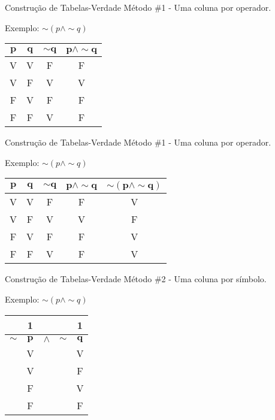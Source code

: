 \begin{frame}[t]{Construção de Tabelas-Verdade} %
	Método \#1 - Uma coluna por operador.
	
	\begin{center}
	Exemplo: $\sim (p \wedge \sim q)$
	
	\vskip 0.8cm
		
	\begin{tabular}{|c|c|c|c|}
	\hline
	$\mathbf{p}$ & $\mathbf{q}$ & $\mathbf{\sim q}$ & $\mathbf{p \wedge \sim q}$ \\
	\hline
	V & V & F & F \\
	\hline
	V & F & V & V \\
	\hline
	F & V & F & F \\
	\hline
	F & F & V & F \\
	\hline
	\end{tabular}
	\end{center}
\end{frame}

\begin{frame}[t]{Construção de Tabelas-Verdade} %
	Método \#1 - Uma coluna por operador.
	
	\begin{center}
	Exemplo: $\sim (p \wedge \sim q)$
	
	\vskip 0.8cm
		
	\begin{tabular}{|c|c|c|c|c|}
	\hline
	$\mathbf{p}$ & $\mathbf{q}$ & $\mathbf{\sim q}$ & $\mathbf{p \wedge \sim q}$ & $\mathbf{\sim(p \wedge \sim q)}$ \\
	\hline
	V & V & F & F & V \\
	\hline
	V & F & V & V & F \\
	\hline
	F & V & F & F & V \\
	\hline
	F & F & V & F & V \\
	\hline
	\end{tabular}
	\end{center}
\end{frame}

\begin{frame}[t]{Construção de Tabelas-Verdade} %
	Método \#2 - Uma coluna por símbolo.
	
	\begin{center}
	Exemplo: $\sim (p \wedge \sim q)$
	
	\vskip 0.8cm
		
	\begin{tabular}{|c|c|c|c|c|}
	\hline
	& {\tiny 1} & & & {\tiny 1} \\
	\hline
	\hline
	$\mathbf{\sim}$ & $\mathbf{p}$ & $\mathbf{\wedge}$ & $\mathbf{\sim}$ & $\mathbf{q}$ \\
	\hline
	  & V &   &   & V \\
	\hline
	  & V &   &   & F \\
	\hline
	  & F &   &   & V \\
	\hline
	  & F &   &   & F \\
	\hline
	\end{tabular}
	\end{center}
\end{frame}

